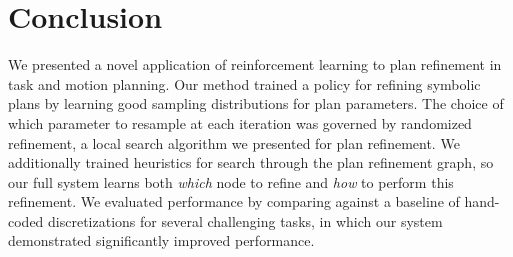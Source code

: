 \section{Conclusion}
We presented a novel application of reinforcement learning to plan refinement in task
and motion planning. Our method trained a policy for refining symbolic plans
by learning good sampling distributions for plan parameters. The choice
of which parameter to resample at each iteration was governed by randomized refinement,
a local search algorithm we presented for plan refinement. We additionally trained heuristics
for search through the plan refinement graph, so our full system learns both \emph{which} node to refine
and \emph{how} to perform this refinement. We evaluated
performance by comparing against a baseline of hand-coded discretizations
for several challenging tasks, in which our system demonstrated significantly
improved performance.
